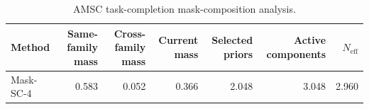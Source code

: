 \begin{table}[ht]
    \caption{AMSC task-completion mask-composition analysis.}
    \label{tbl:amsc_composition}
    \centering
    \scriptsize
    \begin{tabular}{lrrrrrr}
    \toprule
Method & Same-family mass & Cross-family mass & Current mass & Selected priors & Active components & $N_{\mathrm{eff}}$ \\
    \midrule
Mask-SC-4 & 0.583 & 0.052 & 0.366 & 2.048 & 3.048 & 2.960 \\
    \bottomrule
    \end{tabular}
\end{table}
